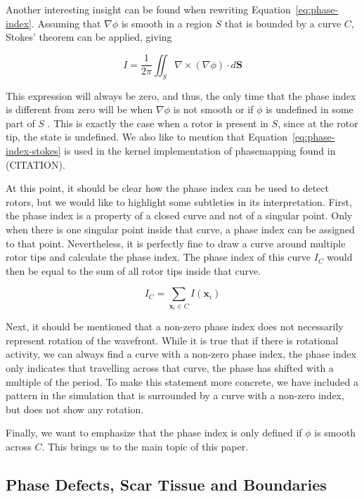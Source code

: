 \documentclass[twocolumn]{article}
\begin{document}
Another interesting insight can be found when rewriting Equation~\ref{eq:phase-index}.
Assuming that $\nabla\phi$ is smooth in a region $S$ that is bounded by a curve $C$,
Stokes' theorem can be applied, giving

\begin{equation}
  I = \frac{1}{2\pi} \iint_S \nabla \times (\nabla \phi) \cdot d\bm{S}
  \label{eq:phase-index-stokes}
\end{equation}

\noindent This expression will always be zero,
and thus, the only time that the phase index is different from zero will be when
$\nabla \phi$ is not smooth or if $\phi$ is undefined in some part of $S$ \autocite{herlin2012reconstruction}.
This is exactly the case when a rotor is present in $S$,
since at the rotor tip, the state is undefined.
We also like to mention that Equation~\ref{eq:phase-index-stokes}
is used in the kernel implementation of phasemapping found in (CITATION).

At this point, it should be clear how the phase index can be used to detect rotors,
but we would like to highlight some subtleties in its interpretation.
First, the phase index is a property of a closed curve
and not of a singular point.
Only when there is one singular point inside that curve,
a phase index can be assigned to that point.
Nevertheless, it is perfectly fine to draw a curve around multiple rotor tips
and calculate the phase index.
The phase index of this curve $I_C$ would then be equal to the sum of all rotor tips inside that curve.

\begin{equation}
  I_C = \sum_{\bm{x}_i\in C} I(\bm{x}_i)
  \label{eq:index-curve}
\end{equation}

Next, it should be mentioned that a non-zero phase index does not necessarily represent rotation of the wavefront.
While it is true that if there is rotational activity,
we can always find a curve with a non-zero phase index,
the phase index only indicates that travelling across that curve,
the phase has shifted with a multiple of the period.
To make this statement more concrete,
we have included a pattern in the simulation that is surrounded by a curve with a non-zero index,
but does not show any rotation.

Finally, we want to emphasize that the phase index is only defined if $\phi$ is smooth across $C$.
This brings us to the main topic of this paper.

\subsection{Phase Defects, Scar Tissue and Boundaries}
\end{document}
